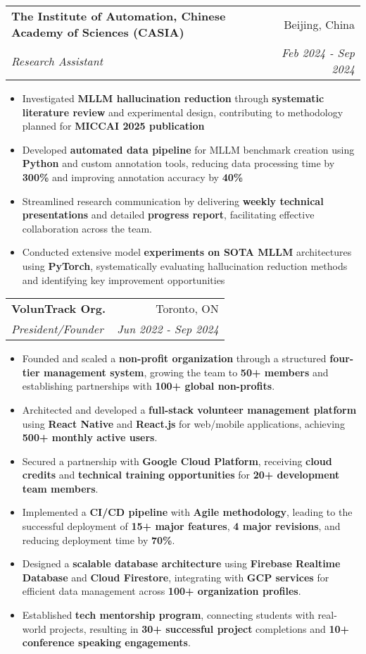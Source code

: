 \documentclass[letterpaper,11pt]{article}
\makeatletter
\newcommand{\resumeItem}[1]{
  \item\small{
    {#1 \vspace{-5pt}}
  }
}
\newcommand{\resumeSubheading}[4]{
  \vspace{-2pt}\item
    \begin{tabular*}{0.97\textwidth}[t]{l@{\extracolsep{\fill}}r}
      \textbf{#1} & #2 \\
      \textit{\small#3} & \textit{\small #4} \\
    \end{tabular*}\vspace{-7pt}
}
\newcommand{\resumeItemListStart}{\begin{itemize}}
\newcommand{\resumeItemListEnd}{\end{itemize}\vspace{-5pt}}
\makeatother
\begin{document}
\resumeSubheading
  {The Institute of Automation, Chinese Academy of Sciences (CASIA) }{Beijing, China}
  {Research Assistant}{Feb 2024 - Sep 2024}
  \resumeItemListStart
    \resumeItem{Investigated \textbf{MLLM hallucination reduction} through \textbf{systematic literature review} and experimental design, contributing to methodology planned for \textbf{MICCAI 2025 publication}}
    \resumeItem{Developed \textbf{automated data pipeline} for MLLM benchmark creation using \textbf{Python} and custom annotation tools, reducing data processing time by \textbf{300\%} and improving annotation accuracy by \textbf{40\%}}
    \resumeItem{Streamlined research communication by delivering \textbf{weekly technical presentations} and detailed \textbf{progress report}, facilitating effective collaboration across the team.}
    \resumeItem{Conducted extensive model \textbf{experiments on SOTA MLLM} architectures using \textbf{PyTorch}, systematically evaluating hallucination reduction methods and identifying key improvement opportunities}
  \resumeItemListEnd

  \resumeSubheading
  {VolunTrack Org.}{Toronto, ON}
  {President/Founder}{Jun 2022 - Sep 2024}
  \resumeItemListStart
    \resumeItem{Founded and scaled a \textbf{non-profit organization} through a structured \textbf{four-tier management system}, growing the team to \textbf{50+ members} and establishing partnerships with \textbf{100+ global non-profits}.}
    \resumeItem{Architected and developed a \textbf{full-stack volunteer management platform} using \textbf{React Native} and \textbf{React.js} for web/mobile applications, achieving \textbf{500+ monthly active users}.}
    \resumeItem{Secured a partnership with \textbf{Google Cloud Platform}, receiving \textbf{cloud credits} and \textbf{technical training opportunities} for \textbf{20+ development team members}.}
    \resumeItem{Implemented a \textbf{CI/CD pipeline} with \textbf{Agile methodology}, leading to the successful deployment of \textbf{15+ major features}, \textbf{4 major revisions}, and reducing deployment time by \textbf{70\%}.}
    \resumeItem{Designed a \textbf{scalable database architecture} using \textbf{Firebase Realtime Database} and \textbf{Cloud Firestore}, integrating with \textbf{GCP services} for efficient data management across \textbf{100+ organization profiles}.}
    \resumeItem{Established \textbf{tech mentorship program}, connecting students with real-world projects, resulting in \textbf{30+ successful project} completions and \textbf{10+ conference speaking engagements}.}
  \resumeItemListEnd
\end{document}
